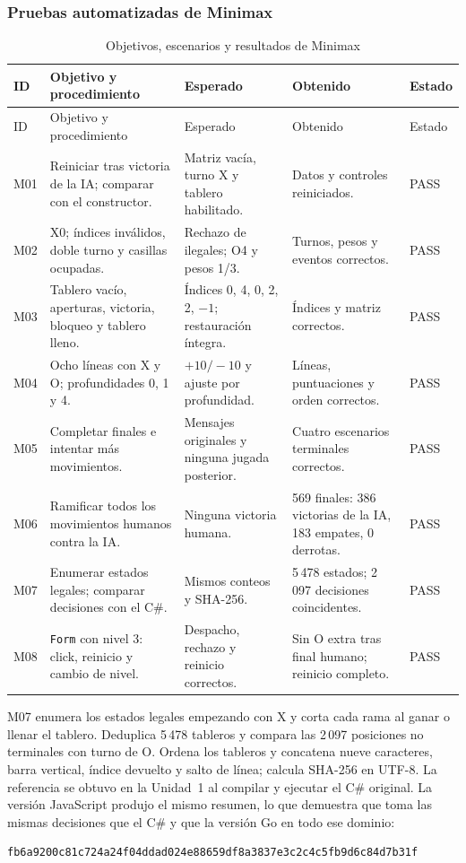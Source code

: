 \documentclass[12pt,a4paper]{article}
\begin{document}
\subsubsection{Pruebas automatizadas de Minimax}
\begin{longtable}{p{1cm}p{3.4cm}p{3.3cm}p{3.4cm}p{1.6cm}}
\caption{Objetivos, escenarios y resultados de Minimax}\\
\toprule ID & Objetivo y procedimiento & Esperado & Obtenido & Estado\\\midrule\endfirsthead
\toprule ID & Objetivo y procedimiento & Esperado & Obtenido & Estado\\\midrule\endhead
M01 & Reiniciar tras victoria de la IA; comparar con el constructor. & Matriz vacía, turno X y tablero habilitado. & Datos y controles reiniciados. & PASS\\
M02 & X0; índices inválidos, doble turno y casillas ocupadas. & Rechazo de ilegales; O4 y pesos 1/3. & Turnos, pesos y eventos correctos. & PASS\\
M03 & Tablero vacío, aperturas, victoria, bloqueo y tablero lleno. & Índices 0, 4, 0, 2, 2, $-1$; restauración íntegra. & Índices y matriz correctos. & PASS\\
M04 & Ocho líneas con X y O; profundidades 0, 1 y 4. & $+10/-10$ y ajuste por profundidad. & Líneas, puntuaciones y orden correctos. & PASS\\
M05 & Completar finales e intentar más movimientos. & Mensajes originales y ninguna jugada posterior. & Cuatro escenarios terminales correctos. & PASS\\
M06 & Ramificar todos los movimientos humanos contra la IA. & Ninguna victoria humana. & 569 finales: 386 victorias de la IA, 183 empates, 0 derrotas. & PASS\\
M07 & Enumerar estados legales; comparar decisiones con el C\#. & Mismos conteos y SHA-256. & 5\,478 estados; 2\,097 decisiones coincidentes. & PASS\\
M08 & \texttt{Form} con nivel 3: click, reinicio y cambio de nivel. & Despacho, rechazo y reinicio correctos. & Sin O extra tras final humano; reinicio completo. & PASS\\
\bottomrule
\end{longtable}

M07 enumera los estados legales empezando con X y corta cada rama al ganar o
llenar el tablero. Deduplica 5\,478 tableros y compara las 2\,097 posiciones no
terminales con turno de O. Ordena los tableros y concatena nueve caracteres,
barra vertical, índice devuelto y salto de línea; calcula SHA-256 en UTF-8. La
referencia se obtuvo en la Unidad~1 al compilar y ejecutar el C\# original. La
versión JavaScript produjo el mismo resumen, lo que demuestra que toma las mismas
decisiones que el C\# y que la versión Go en todo ese dominio:
\begin{lstlisting}
fb6a9200c81c724a24f04ddad024e88659df8a3837e3c2c4c5fb9d6c84d7b31f
\end{lstlisting}
\end{document}
